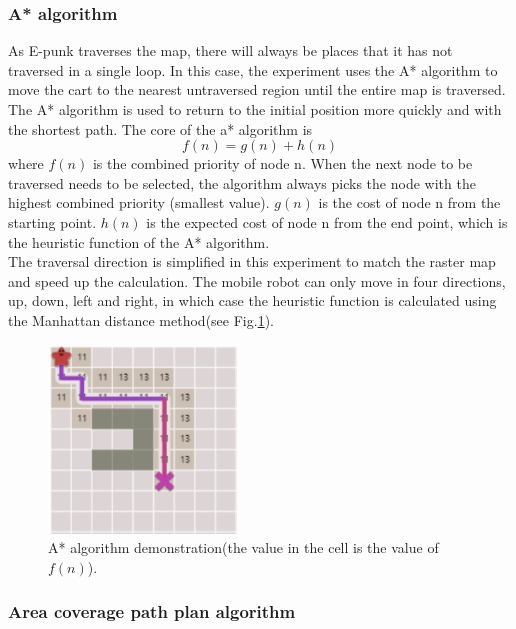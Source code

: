 \documentclass[conference]{IEEEtran}
\begin{document}
\subsubsection{A* algorithm}
As E-punk traverses the map, there will always be places that it has not traversed in a single loop. In this case, the experiment uses the A* algorithm to move the cart to the nearest untraversed region until the entire map is traversed.\\
The A* algorithm\cite{hart1968formal} is used to return to the initial position more quickly and with the shortest path. The core of the a* algorithm is
\begin{equation}
  f(n) = g(n) + h(n)
\end{equation}
where $f(n)$ is the combined priority of node n. When the next node to be traversed needs to be selected, the algorithm always picks the node with the highest combined priority (smallest value). $g(n)$ is the cost of node n from the starting point. $h(n)$ is the expected cost of node n from the end point, which is the heuristic function of the A* algorithm.\\
The traversal direction is simplified in this experiment to match the raster map and speed up the calculation. The mobile robot can only move in four directions, up, down, left and right, in which case the heuristic function is calculated using the Manhattan distance method(see Fig.\ref{fig4}).

\setlength{\belowcaptionskip}{-1cm}
\begin{figure}[htbp]
\centerline{\includegraphics[width=5cm,height=5cm]{RS_Report/astar.png}}
\caption{A* algorithm demonstration(the value in the cell is the value of $f(n)$).}
\label{fig4}
\end{figure}

\subsubsection{Area coverage path plan algorithm}
\end{document}
